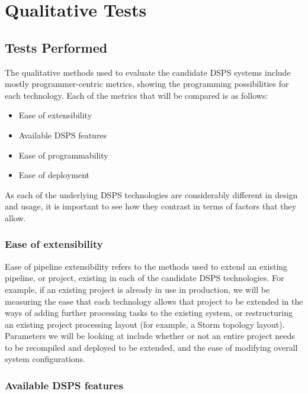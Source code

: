 


\section{Qualitative Tests} %
\label{sub:qualitative_tests}

\subsection{Tests Performed} %
\label{ssub:tests_performed}

The qualitative methods used to evaluate the candidate DSPS systems include mostly programmer-centric metrics, showing the
programming possibilities for each technology. Each of the metrics that will be compared is as follows:

\begin{itemize}
  \item Ease of extensibility
  \item Available DSPS features
  \item Ease of programmability
  \item Ease of deployment
\end{itemize}

As each of the underlying DSPS technologies are considerably different in design and usage, it is important to see how
they contrast in terms of factors that they allow.

\subsubsection{Ease of extensibility}

Ease of pipeline extensibility refers to the methods used to extend an existing pipeline, or project, existing in each
of the candidate DSPS technologies. For example, if an existing project is already in use in production, we will be measuring the
ease that each technology allows that project to be extended in the ways of adding further processing tasks to the
existing system, or restructuring an existing project processing layout (for example, a Storm topology layout). Parameters
we will be looking at include whether or not an entire project needs to be recompiled and deployed to be extended, and the
ease of modifying overall system configurations.

\subsubsection{Available DSPS features}

